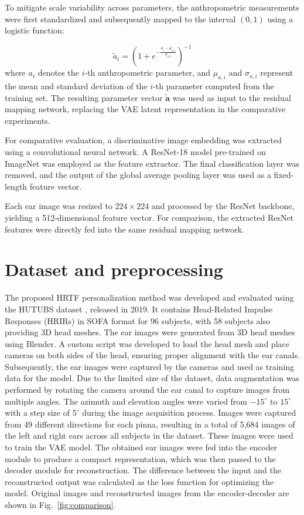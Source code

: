 \documentclass[a4paper,fleqn]{cas-dc}
\begin{document}
To mitigate scale variability across parameters, the anthropometric measurements were first standardized and subsequently mapped to the interval $(0,1)$ using a logistic function:

\begin{equation}
\tilde{a}_i = \left(1 + e^{-\frac{a_i - \mu_{a,i}}{\sigma_{a,i}}}\right)^{-1}
\end{equation}
where $a_i$ denotes the $i$-th anthropometric parameter, and $\mu_{a,i}$ and $\sigma_{a,i}$ represent the mean and standard deviation of the $i$-th parameter computed from the training set. The resulting parameter vector $\tilde{\mathbf{a}}$ was used as input to the residual mapping network, replacing the VAE latent representation in the comparative experiments.

For comparative evaluation, a discriminative image embedding was extracted using a convolutional neural network. A ResNet-18 model pre-trained on ImageNet was employed as the feature extractor. The final classification layer was removed, and the output of the global average pooling layer was used as a fixed-length feature vector.

Each ear image was resized to $224 \times 224$ and processed by the ResNet backbone, yielding a 512-dimensional feature vector. For comparison, the extracted ResNet features were directly fed into the same residual mapping network.





\section{Dataset and preprocessing}
The proposed HRTF personalization method was developed and evaluated using the HUTUBS dataset \cite{brinkmann_cross-evaluated_2019}, released in 2019. It contains Head-Related Impulse Responses (HRIRs) in SOFA format for 96 subjects, with 58 subjects also providing 3D head meshes. The ear images were generated from 3D head meshes using Blender. A custom script was developed to load the head mesh and place cameras on both sides of the head, ensuring proper alignment with the ear canals. Subsequently, the ear images were captured by the cameras and used as training data for the model. Due to the limited size of the dataset, data augmentation was performed by rotating the camera around the ear canal to capture images from multiple angles. The azimuth and elevation angles were varied from $ -15^{\circ} $ to $ 15^{\circ} $ with a step size of $ 5^{\circ} $ during the image acquisition process. Images were captured from 49 different directions for each pinna, resulting in a total of 5,684 images of the left and right ears across all subjects in the dataset. These images were used to train the VAE model. The obtained ear images were fed into the encoder module to produce a compact representation, which was then passed to the decoder module for reconstruction. The difference between the input and the reconstructed output was calculated as the loss function for optimizing the model. Original images and reconstructed images from the encoder-decoder are shown in Fig.~\ref{fig:comparison}. 
\end{document}
